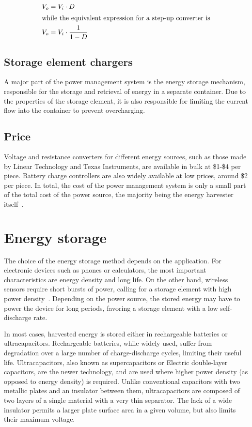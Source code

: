 \documentclass[a4paper,10pt]{article}
\begin{document}
\begin{align}
  V_o &= V_i \cdot D \\
\intertext{while the equivalent expression for a step-up converter is}
  V_o &= V_i \cdot \frac{1}{1-D}
\end{align}


\subsection{Storage element chargers}

A major part of the power management system is the energy storage mechanism, responsible for the storage and retrieval of energy in a separate container. Due to the properties of the storage element, it is also responsible for limiting the current flow into the container to prevent overcharging. 

\subsection{Price}

Voltage and resistance converters for different energy sources, such as those made by Linear Technology and Texas Instruments, are available in bulk at \$1-\$4 per piece. Battery charge controllers are also widely available at low prices, around \$2 per piece. In total, the cost of the power management system is only a small part of the total cost of the power source, the majority being the energy harvester itself~\cite{lt:cenik, ti:eh}. 

\section{Energy storage}

The choice of the energy storage method depends on the application. For electronic devices such as phones or calculators, the most important characteristics are energy density and long life. On the other hand, wireless sensors require short bursts of power, calling for a storage element with high power density~\cite{cap-wsn-ieee}. Depending on the power source, the stored energy may have to power the device for long periods, favoring a storage element with a low self-discharge rate. 

In most cases, harvested energy is stored either in rechargeable batteries or ultracapacitors. Rechargeable batteries, while widely used, suffer from degradation over a large number of charge-discharge cycles, limiting their useful life. Ultracapacitors, also known as supercapacitors or Electric double-layer capacitors, are the newer technology, and are used where higher power density (as opposed to energy density) is required. Unlike conventional capacitors with two metallic plates and an insulator between them, ultracapacitors are composed of two layers of a single material with a very thin separator. The lack of a wide insulator permits a larger plate surface area in a given volume, but also limits their maximum voltage. 
\end{document}
